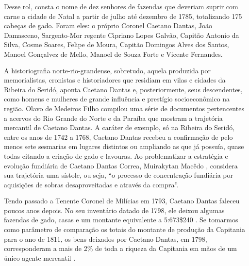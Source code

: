 \begin{refsection}
Desse rol, consta o nome de dez senhores de fazendas que deveriam suprir com carne a cidade de Natal a partir de julho até dezembro de 1785, totalizando 175 cabeças de gado. Foram eles: o próprio Coronel Caetano Dantas, João Damasceno, Sargento-Mor regente Cipriano Lopes Galvão, Capitão Antonio da Silva, Cosme Soares, Felipe de Moura, Capitão Domingos Alves dos Santos, Manoel Gonçalvez de Mello, Manoel de Souza Forte e Vicente Fernandes.

A historiografia norte-rio-grandense, sobretudo, aquela produzida por memorialistas, cronistas e historiadores que residiam em vilas e cidades da Ribeira do Seridó, aponta Caetano Dantas e, posteriormente, seus descendentes, como homens e mulheres de grande influência e prestígio socioeconômico na região. Olavo de Medeiros Filho compilou uma série de documentos pertencentes a acervos do Rio Grande do Norte e da Paraíba que mostram a trajetória mercantil de Caetano Dantas. A caráter de exemplo, só na Ribeira do Seridó, entre os anos de 1742 a 1768, Caetano Dantas recebeu a confirmação de pelo menos sete sesmarias em lugares distintos ou ampliando as que já possuía, quase todas citando a criação de gado e lavouras. Ao problematizar a estratégia e evolução fundiária de Caetano Dantas Correa, Muirakytan Macêdo \citeyear[p.~81]{Macedo2007rusticos}, considera sua trajetória uma sístole, ou seja, “o processo de concentração fundiária por aquisições de sobras desaproveitadas e através da compra”.

Tendo passado a Tenente Coronel de Milícias em 1793, Caetano Dantas faleceu poucos anos depois. No seu inventário datado de 1798, ele deixou algumas fazendas de gado, casas e um montante equivalente a 5:673\$240 \cite[p.~120--121]{MedeirosFilho1983velhos}. Se tomarmos como parâmetro de comparação os totais do montante de produção da Capitania para o ano de 1811, os bens deixados por Caetano Dantas, em 1798, corresponderam a mais de 2\% de toda a riqueza da Capitania em mãos de um único agente mercantil \cite{Dias2007carne}.


\end{refsection}
